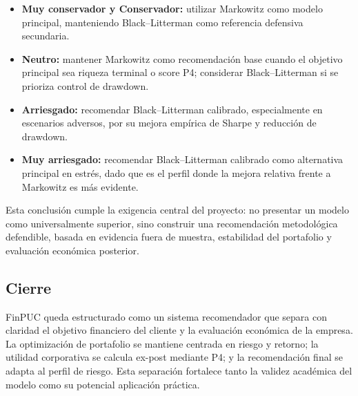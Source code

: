 \documentclass[11pt]{article}
\begin{document}
\begin{itemize}
    \item \textbf{Muy conservador y Conservador:} utilizar Markowitz como modelo principal, manteniendo Black--Litterman como referencia defensiva secundaria.
    \item \textbf{Neutro:} mantener Markowitz como recomendaci\'on base cuando el objetivo principal sea riqueza terminal o score P4; considerar Black--Litterman si se prioriza control de drawdown.
    \item \textbf{Arriesgado:} recomendar Black--Litterman calibrado, especialmente en escenarios adversos, por su mejora emp\'irica de Sharpe y reducci\'on de drawdown.
    \item \textbf{Muy arriesgado:} recomendar Black--Litterman calibrado como alternativa principal en estr\'es, dado que es el perfil donde la mejora relativa frente a Markowitz es m\'as evidente.
\end{itemize}

Esta conclusi\'on cumple la exigencia central del proyecto: no presentar un modelo como universalmente superior, sino construir una recomendaci\'on metodol\'ogica defendible, basada en evidencia fuera de muestra, estabilidad del portafolio y evaluaci\'on econ\'omica posterior.

\subsection{Cierre}

FinPUC queda estructurado como un sistema recomendador que separa con claridad el objetivo financiero del cliente y la evaluaci\'on econ\'omica de la empresa. La optimizaci\'on de portafolio se mantiene centrada en riesgo y retorno; la utilidad corporativa se calcula ex-post mediante P4; y la recomendaci\'on final se adapta al perfil de riesgo. Esta separaci\'on fortalece tanto la validez acad\'emica del modelo como su potencial aplicaci\'on pr\'actica.
\end{document}
